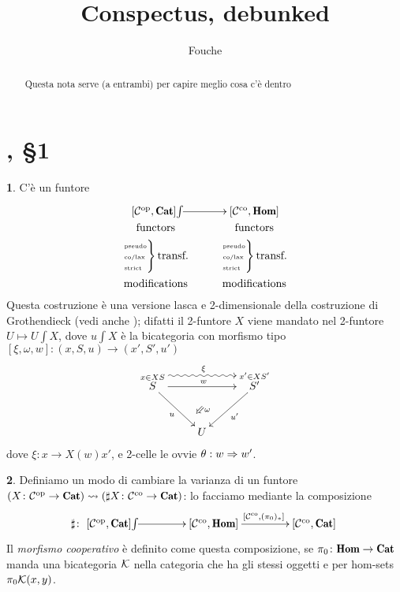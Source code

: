 \documentclass[a4paper,10pt]{amsart}
\title{Conspectus, debunked}
\author{Fouche}
\def\eent{\!\!\int\!\!}
\theoremstyle{definition}
\newtheorem{prg}{}[section]
\begin{document}
\maketitle
\begin{abstract}
Questa nota serve (a entrambi) per capire meglio cosa c'è dentro \cite{street1981conspectus}
\end{abstract}
\section{\cite{street1981conspectus}, §1}
\begin{prg}
C'è un funtore
\[
\xymatrix@R=0cm{
	[\C^\opp, \Cat] \ar[r]^\eent & [\C^\co,\cate{Hom}]\\
	\text{functors} & \text{functors}\\
	{\begin{rcases*}
	\text{\tiny pseudo}\\[-5pt]
	\text{\tiny co/lax}\\[-5pt]
	\text{\tiny strict}
	\end{rcases*}
	\text{transf.}} & 
	{\begin{rcases*}
	\text{\tiny pseudo}\\[-5pt]
	\text{\tiny co/lax}\\[-5pt]
	\text{\tiny strict}
	\end{rcases*}
	\text{transf.}}\\
	\text{modifications} & \text{modifications}
}
\]
Questa costruzione è una versione lasca e 2-dimensionale della costruzione di Grothendieck (vedi anche \cite[Appendix A]{groth2011monoidal}); difatti il 2-funtore $X$ viene mandato nel 2-funtore $U\mapsto U\eent X$, dove $u\eent X$ è la bicategoria con morfismo tipo $[\xi,\omega,w]\colon (x,S,u)\to (x', S', u')$
\[
\xymatrix{
	\overset{x\in XS}S\ar[rr]^w\ar[dr]_u\ar@<10pt>@{~>}[rr]^\xi && \overset{x'\in XS'}{S'}\ar[dl]^{u'}\\
	& U \ar@{}[u]|{\Swarrow\omega}
}
\]
dove $\xi \colon x \to X(w)x'$, e 2-celle le ovvie $\theta : w \Rightarrow w'$.
\end{prg}
\begin{prg}
Definiamo un modo di cambiare la varianza di un funtore $(X \colon \C^\opp \to \Cat) \rightsquigarrow (\sharp X \colon \C^\co \to \Cat)$: lo facciamo mediante la composizione
\[
\sharp \colon 
\xymatrix@C=1.5cm{
	[\C^\opp, \Cat] \ar[r]^\eent & [\C^\co,\cate{Hom}] \ar[r]^{[\C^\co,(\pi_0)_*]} & [\C^\co, \Cat]\\
}
\]
Il \emph{morfismo cooperativo} è definito come questa composizione, se $\pi_0 \colon \cate{Hom}\to \Cat$ manda una bicategoria  $\mathcal{K}$ nella categoria che ha gli stessi oggetti e per hom-sets $\pi_0\mathcal{K}(x,y)$.
\end{prg}
\end{document}
